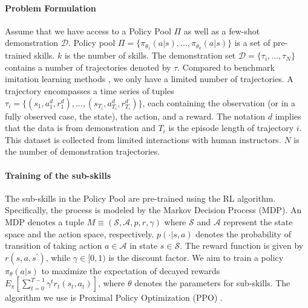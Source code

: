\documentclass[conference]{IEEEtran}
\begin{document}
\paragraph{Problem Formulation}
Assume that we have access to a Policy Pool $\Pi$ as well as a few-shot demonstration \(\mathcal{D}\). Policy pool  \(\Pi=\{\pi_{\theta_1}(a|s),...,\pi_{\theta_k}(a|s)\}\) is a set of pre-trained skills. \(k\) is the number of skills. The demonstration set \(\mathcal{D}=\{\tau_{i},...,\tau_{N}\}\) contains a number of trajectories denoted by $\tau$. Compared to benchmark imitation learning methods \cite{pertsch2020accelerating,duan2017one}, we only have a limited number of trajectories. A trajectory encompasses a time series of tuples \(\tau_{i}=\{(s_{1},a_{1}^{d},r_{1}^{d}),...,(s_{T_{i}},a_{T_{i}}^{d},r_{T_{i}}^{d})\}\), each containing the observation (or in a fully observed case, the state), the action, and a reward. The notation \(d\) implies that the data is from demonstration and \(T_i\) is the episode length of trajectory \(i\). This dataset is collected from limited interactions with human instructors. \(N\) is the number of demonstration trajectories. 

\paragraph{Training of the sub-skills}
The sub-skills in the Policy Pool are pre-trained using the RL algorithm. Specifically, the process is modeled by the Markov Decision Process (MDP). An MDP denotes a tuple $M\equiv (\mathcal{S},\mathcal{A},p,r,\gamma)$ where $\mathcal{S}$ and $\mathcal{A}$ represent the state space and the action space, respectively. $p(\cdot |s,a)$ denotes the probability of transition of taking action $a\in \mathcal{A}$ in state $s\in \mathcal{S}$. The reward function is given by $r(s,a,s^{'})$, while $\gamma \in [0,1)$ is the discount factor. We aim to train a policy \(\pi_{\theta}(a|s)\) to maximize the expectation of decayed rewards \(E_{\pi}\left[\sum^{T-1}_{t=0}\gamma^{t}r_t(s_t,a_t)\right]\), where $\theta$ denotes the parameters for sub-skills. The algorithm we use is Proximal Policy Optimization (PPO) \cite{schulman2017proximal}.
\end{document}
